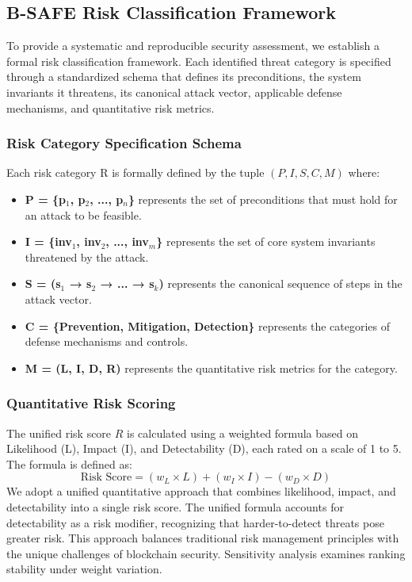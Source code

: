 \subsection{B-SAFE Risk Classification Framework}
\label{sec:methodology_risk_framework}
To provide a systematic and reproducible security assessment, we establish a formal risk classification framework. Each identified threat category is specified through a standardized schema that defines its preconditions, the system invariants it threatens, its canonical attack vector, applicable defense mechanisms, and quantitative risk metrics.

\subsubsection{Risk Category Specification Schema}
Each risk category R is formally defined by the tuple \( (P, I, S, C, M) \) where:
\begin{itemize}
    \item \textbf{P = \{p$_1$, p$_2$, ..., p$_n$\}} represents the set of preconditions that must hold for an attack to be feasible.
    \item \textbf{I = \{inv$_1$, inv$_2$, ..., inv$_m$\}} represents the set of core system invariants threatened by the attack.
    \item \textbf{S = (s$_1$ → s$_2$ → ... → s$_k$)} represents the canonical sequence of steps in the attack vector.
    \item \textbf{C = \{Prevention, Mitigation, Detection\}} represents the categories of defense mechanisms and controls.
    \item \textbf{M = (L, I, D, R)} represents the quantitative risk metrics for the category.
\end{itemize}

\subsubsection{Quantitative Risk Scoring}
The unified risk score \( R \) is calculated using a weighted formula based on Likelihood (L), Impact (I), and Detectability (D), each rated on a scale of 1 to 5. The formula is defined as:
\begin{equation}
    \text{Risk Score} = (w_L \times L) + (w_I \times I) - (w_D \times D)
\end{equation}
We adopt a unified quantitative approach that combines likelihood, impact, and detectability into a single risk score. The unified formula accounts for detectability as a risk modifier, recognizing that harder-to-detect threats pose greater risk. This approach balances traditional risk management principles with the unique challenges of blockchain security. Sensitivity analysis examines ranking stability under weight variation.

